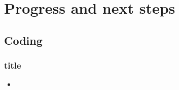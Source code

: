 \chapter{Progress and next steps}
\label{Chapter7}

\section{Coding}
\subsection{title}


\begin{itemize}
    \item 
\end{itemize}